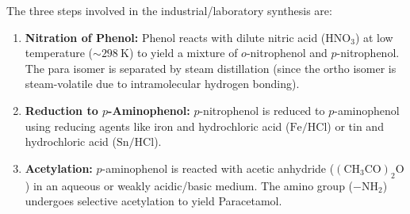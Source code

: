 \documentclass[12pt,a4paper]{article}
\begin{document}
\begin{tcolorbox}[defbox, title={Paracetamol Synthesis Reactions}]
The three steps involved in the industrial/laboratory synthesis are:
\begin{enumerate}[leftmargin=*, itemsep=3pt, topsep=2pt]
  \item \textbf{Nitration of Phenol:} Phenol reacts with dilute nitric acid ($\mathrm{HNO_3}$) at low temperature ($\sim 298\ \mathrm{K}$) to yield a mixture of $o$-nitrophenol and $p$-nitrophenol. The para isomer is separated by steam distillation (since the ortho isomer is steam-volatile due to intramolecular hydrogen bonding).
  \item \textbf{Reduction to $p$-Aminophenol:} $p$-nitrophenol is reduced to $p$-aminophenol using reducing agents like iron and hydrochloric acid ($\mathrm{Fe/HCl}$) or tin and hydrochloric acid ($\mathrm{Sn/HCl}$).
  \item \textbf{Acetylation:} $p$-aminophenol is reacted with acetic anhydride ($\mathrm{(CH_3CO)_2O}$) in an aqueous or weakly acidic/basic medium. The amino group ($-\mathrm{NH_2}$) undergoes selective acetylation to yield Paracetamol.
\end{enumerate}
\end{tcolorbox}

\begin{tcolorbox}[tikzbox, title={Reaction Scheme: Phenol to Paracetamol}]
\centering
{}
\end{tcolorbox}
\end{document}
